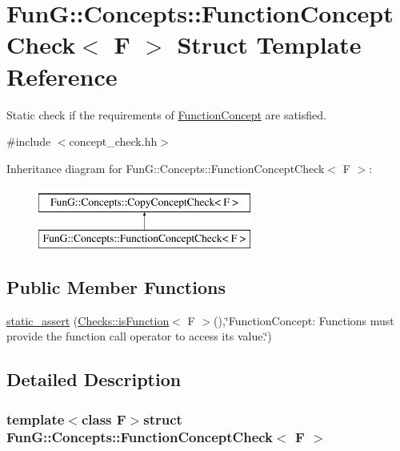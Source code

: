 \hypertarget{structFunG_1_1Concepts_1_1FunctionConceptCheck}{\section{\-Fun\-G\-:\-:\-Concepts\-:\-:\-Function\-Concept\-Check$<$ \-F $>$ \-Struct \-Template \-Reference}
\label{structFunG_1_1Concepts_1_1FunctionConceptCheck}
}


\-Static check if the requirements of \hyperlink{structFunG_1_1Concepts_1_1FunctionConcept}{\-Function\-Concept} are satisfied.  




{\ttfamily \#include $<$concept\-\_\-check.\-hh$>$}

\-Inheritance diagram for \-Fun\-G\-:\-:\-Concepts\-:\-:\-Function\-Concept\-Check$<$ \-F $>$\-:\begin{figure}[H]
\begin{center}
\leavevmode
\includegraphics[height=2.000000cm]{structFunG_1_1Concepts_1_1FunctionConceptCheck}
\end{center}
\end{figure}
\subsection*{\-Public \-Member \-Functions}
\begin{DoxyCompactItemize}
\item 
\hyperlink{structFunG_1_1Concepts_1_1FunctionConceptCheck_ac5e3f9a832be4b8711e6d8c7cb356391}{static\-\_\-assert} (\hyperlink{group__ConceptGroup_gac6e6c5574a8497cc0749e5a613e4d57c}{\-Checks\-::is\-Function}$<$ \-F $>$(),\char`\"{}\-Function\-Concept\-: \-Functions must provide the function call operator to access its value.\char`\"{})
\end{DoxyCompactItemize}


\subsection{\-Detailed \-Description}
\subsubsection*{template$<$class F$>$struct Fun\-G\-::\-Concepts\-::\-Function\-Concept\-Check$<$ F $>$}


